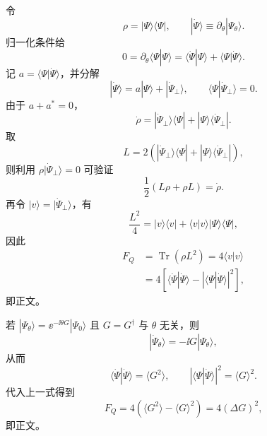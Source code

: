 
\begin{derivation}
令
\begin{equation*}
\rho=|\Psi\rangle\langle\Psi|,
\qquad
|\dot\Psi\rangle\equiv\partial_\theta|\Psi_\theta\rangle.
\end{equation*}
归一化条件给
\begin{equation*}
0=\partial_\theta\langle\Psi|\Psi\rangle
=\langle\dot\Psi|\Psi\rangle+\langle\Psi|\dot\Psi\rangle.
\end{equation*}
记 $a=\langle\Psi|\dot\Psi\rangle$，并分解
\begin{equation*}
|\dot\Psi\rangle=a|\Psi\rangle+|\dot\Psi_\perp\rangle,
\qquad
\langle\Psi|\dot\Psi_\perp\rangle=0.
\end{equation*}
由于 $a+a^*=0$，
\begin{equation*}
\dot\rho
=|\dot\Psi_\perp\rangle\langle\Psi|
+|\Psi\rangle\langle\dot\Psi_\perp|.
\end{equation*}
取
\begin{equation*}
L=2\left(
|\dot\Psi_\perp\rangle\langle\Psi|
+|\Psi\rangle\langle\dot\Psi_\perp|
\right),
\end{equation*}
则利用 $\rho|\dot\Psi_\perp\rangle=0$ 可验证
\begin{equation*}
\frac12(L\rho+\rho L)=\dot\rho.
\end{equation*}
再令 $|v\rangle=|\dot\Psi_\perp\rangle$，有
\begin{equation*}
\frac{L^2}{4}
=|v\rangle\langle v|+\langle v|v\rangle|\Psi\rangle\langle\Psi|,
\end{equation*}
因此
\begin{align*}
F_Q
&=\operatorname{Tr}(\rho L^2)
=4\langle v|v\rangle\\
&=4\left[
\langle\dot\Psi|\dot\Psi\rangle
-|\langle\Psi|\dot\Psi\rangle|^2
\right],
\end{align*}
即正文。

若 $|\Psi_\theta\rangle=\ee^{-\ii\theta G}|\Psi_0\rangle$ 且 $G=G^\dagger$ 与 $\theta$ 无关，则
\begin{equation*}
|\dot\Psi_\theta\rangle=-\ii G|\Psi_\theta\rangle,
\end{equation*}
从而
\begin{equation*}
\langle\dot\Psi|\dot\Psi\rangle=\langle G^2\rangle,
\qquad
|\langle\Psi|\dot\Psi\rangle|^2=\langle G\rangle^2.
\end{equation*}
代入上一式得到
\begin{equation*}
F_Q=4\left(\langle G^2\rangle-\langle G\rangle^2\right)
=4(\Delta G)^2,
\end{equation*}
即正文。
\end{derivation}

